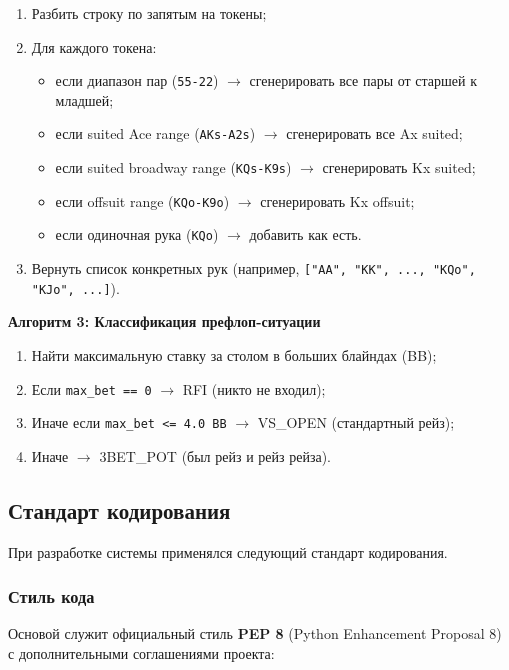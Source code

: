 \begin{enumerate}
    \item Разбить строку по запятым на токены;
    \item Для каждого токена:
    \begin{itemize}
        \item если диапазон пар (\texttt{55-22}) $\rightarrow$ сгенерировать все пары от старшей к младшей;
        \item если suited Ace range (\texttt{AKs-A2s}) $\rightarrow$ сгенерировать все Ax suited;
        \item если suited broadway range (\texttt{KQs-K9s}) $\rightarrow$ сгенерировать Kx suited;
        \item если offsuit range (\texttt{KQo-K9o}) $\rightarrow$ сгенерировать Kx offsuit;
        \item если одиночная рука (\texttt{KQo}) $\rightarrow$ добавить как есть.
    \end{itemize}
    \item Вернуть список конкретных рук (например, \texttt{["AA", "KK", ..., "KQo", "KJo", ...]}).
\end{enumerate}

\textbf{Алгоритм 3: Классификация префлоп-ситуации}

\begin{enumerate}
    \item Найти максимальную ставку за столом в больших блайндах (BB);
    \item Если \texttt{max\_bet == 0} $\rightarrow$ RFI (никто не входил);
    \item Иначе если \texttt{max\_bet <= 4.0 BB} $\rightarrow$ VS\_OPEN (стандартный рейз);
    \item Иначе $\rightarrow$ 3BET\_POT (был рейз и рейз рейза).
\end{enumerate}

\subsection{Стандарт кодирования}

При разработке системы применялся следующий стандарт кодирования.

\subsubsection*{Стиль кода}

Основой служит официальный стиль \textbf{PEP 8} (Python Enhancement Proposal 8) с дополнительными соглашениями проекта:

